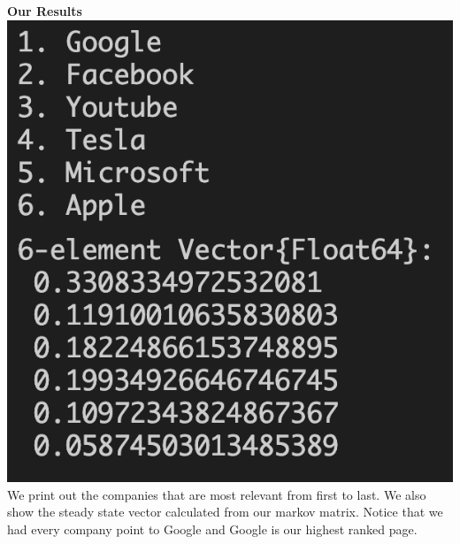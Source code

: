 \documentclass{article}
\begin{document}
\textbf{Our Results}\\
\includegraphics[scale = 0.5]{results.png}\\
We print out the companies that are most relevant from first to last. We also show the steady state vector calculated from our markov matrix. Notice that we had every company point to Google and Google is our highest ranked page.
\end{document}
